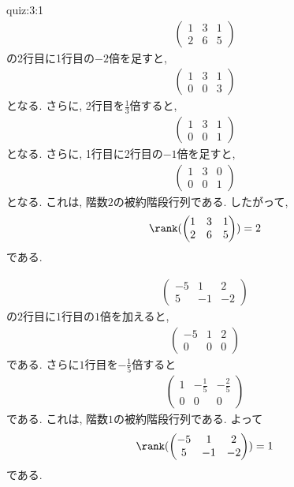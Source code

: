 \begin{answerof}{quiz:3:1}
  \begin{align*}
    \begin{pmatrix}
      1&3&1\\2&6&5
    \end{pmatrix}
  \end{align*}
  の2行目に1行目の$-2$倍を足すと,
  \begin{align*}
    \begin{pmatrix}
      1&3&1\\0&0&3
    \end{pmatrix}
  \end{align*}
  となる. さらに, 2行目を$\frac{1}{3}$倍すると,
  \begin{align*}
    \begin{pmatrix}
      1&3&1\\0&0&1
    \end{pmatrix}
  \end{align*}
  となる. さらに, 1行目に2行目の$-1$倍を足すと,
  \begin{align*}
    \begin{pmatrix}
      1&3&0\\0&0&1
    \end{pmatrix}
  \end{align*}
  となる.  これは, 階数$2$の被約階段行列である.
  したがって, 
  \begin{align*}
    \rank(
    \begin{pmatrix}
      1&3&1\\2&6&5
    \end{pmatrix}
    )=2
  \end{align*}
  である.


  \begin{align*}
    \begin{pmatrix}
      -5&1&2\\5&-1&-2
    \end{pmatrix}
  \end{align*}
  の$2$行目に$1$行目の$1$倍を加えると,
  \begin{align*}
    \begin{pmatrix}
      -5&1&2\\0&0&0
    \end{pmatrix}
  \end{align*}
  である. さらに$1$行目を$-\frac{1}{5}$倍すると
  \begin{align*}
    \begin{pmatrix}
      1&-\frac{1}{5}&-\frac{2}{5}\\0&0&0
    \end{pmatrix}
  \end{align*}
  である.
  これは, 階数$1$の被約階段行列である.
  よって
  \begin{align*}
    \rank(
    \begin{pmatrix}
      -5&1&2\\5&-1&-2
    \end{pmatrix}
    )=1
  \end{align*}
  である.


\end{answerof}
